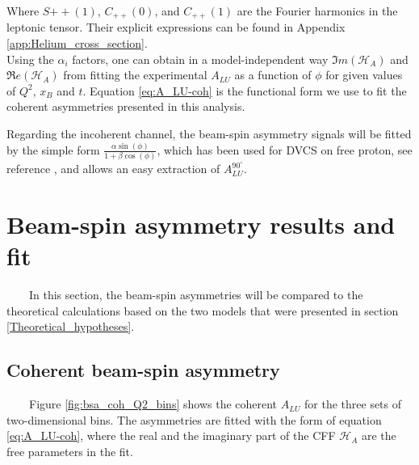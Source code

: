 Where $S{++}(1)$, $C_{++}(0)$, and $C_{++}(1)$ are the Fourier harmonics in the 
leptonic tensor. Their explicit expressions can be found in Appendix 
\ref{app:Helium_cross_section}.\\  

Using the $\alpha_{i}$ factors, one can obtain in a model-independent way $\Im
m(\mathcal{H}_{A})$ and $\Re e(\mathcal{H}_{A})$ from fitting the experimental 
$A_{LU}$ as a function of $\phi$ for given values of $Q^2$, $x_B$ and $t$.  
Equation \ref{eq:A_LU-coh} is the functional form we use to fit the coherent asymmetries 
presented in this analysis. 

Regarding the incoherent channel, the beam-spin 
asymmetry signals will be fitted by the simple form $\frac{\alpha \sin(\phi)}{1 + 
\beta \cos(\phi)}$, which has been used for DVCS on free proton, see reference 
\cite{FX_BSA, FX_analysis_note}, and allows an easy extraction of 
$A^{90^{\circ}}_{LU}$.  


\section{Beam-spin asymmetry results and fit}
~~~~In this section, the beam-spin asymmetries will be compared to the theoretical calculations based on the two models that were presented in section \ref{Theoretical_hypotheses}.\\

\subsection{Coherent beam-spin asymmetry}
~~~~Figure \ref{fig:bsa_coh_Q2_bins} shows the coherent $A_{LU}$ for the three 
sets of two-dimensional bins. The asymmetries are fitted with the form of
equation \ref{eq:A_LU-coh}, where the real and the imaginary part of the CFF 
$\mathcal{H}_{A}$ are the free parameters in the fit.\\

